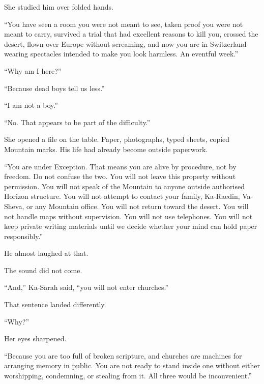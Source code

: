 She studied him over folded hands.\par

“You have seen a room you were not meant to see, taken proof you were not meant to carry, survived a trial that had excellent reasons to kill you, crossed the desert, flown over Europe without screaming, and now you are in Switzerland wearing spectacles intended to make you look harmless. An eventful week.”\par

“Why am I here?”\par

“Because dead boys tell us less.”\par

“I am not a boy.”\par

“No. That appears to be part of the difficulty.”\par

She opened a file on the table. Paper, photographs, typed sheets, copied Mountain marks. His life had already become outside paperwork.\par

“You are under Exception. That means you are alive by procedure, not by freedom. Do not confuse the two. You will not leave this property without permission. You will not speak of the Mountain to anyone outside authorised Horizon structure. You will not attempt to contact your family, Ka-Raedin, Va-Sheva, or any Mountain office. You will not return toward the desert. You will not handle maps without supervision. You will not use telephones. You will not keep private writing materials until we decide whether your mind can hold paper responsibly.”\par

He almost laughed at that.\par

The sound did not come.\par

“And,” Ka-Sarah said, “you will not enter churches.”\par

That sentence landed differently.\par

“Why?”\par

Her eyes sharpened.\par

“Because you are too full of broken scripture, and churches are machines for arranging memory in public. You are not ready to stand inside one without either worshipping, condemning, or stealing from it. All three would be inconvenient.”\par

